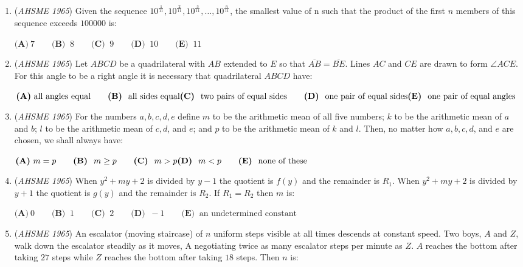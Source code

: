 \begin{enumerate}
 $\textbf{(A)}\ .0301 \qquad  \textbf{(B) }\ .0349 \qquad  \textbf{(C) }\ .0399 \qquad  \textbf{(D) }\ .0401 \qquad  \textbf{(E) }\ .0499\qquad$


	\item (\textit{AHSME 1965}) Given the sequence $10^{\frac {1}{11}},10^{\frac {2}{11}},10^{\frac {3}{11}},\ldots,10^{\frac {n}{11}}$, 
the smallest value of n such that the product of the first $n$ members of this sequence exceeds $100000$ is: 


 $\textbf{(A)}\ 7 \qquad  \textbf{(B) }\ 8 \qquad  \textbf{(C) }\ 9 \qquad  \textbf{(D) }\ 10 \qquad  \textbf{(E) }\ 11$


	\item (\textit{AHSME 1965}) Let $ABCD$ be a quadrilateral with $AB$ extended to $E$ so that $\overline{AB} = \overline{BE}$. 
Lines $AC$ and $CE$ are drawn to form $\angle{ACE}$. For this angle to be a right angle it is necessary that quadrilateral $ABCD$ have: 


 $\textbf{(A)}\ \text{all angles equal} \qquad \textbf{(B) }\ \text{all sides equal} \\ \textbf{(C) }\ \text{two pairs of equal sides} \qquad \textbf{(D) }\ \text{one pair of equal sides} \\ \textbf{(E) }\ \text{one pair of equal angles}$


	\item (\textit{AHSME 1965}) For the numbers $a, b, c, d, e$ define $m$ to be the arithmetic mean of all five numbers; 
$k$ to be the arithmetic mean of $a$ and $b$; $l$ to be the arithmetic mean of $c, d$, and $e$; 
and $p$ to be the arithmetic mean of $k$ and $l$. Then, no matter how $a, b, c, d$, and $e$ are chosen, we shall always have: 


 $\textbf{(A)}\ m = p \qquad  \textbf{(B) }\ m \ge p \qquad  \textbf{(C) }\ m > p \qquad \\ \textbf{(D) }\ m < p\qquad \textbf{(E) }\ \text{none of these}$


	\item (\textit{AHSME 1965}) When $y^2 + my + 2$ is divided by $y - 1$ the quotient is $f(y)$ and the remainder is $R_1$. 
When $y^2 + my + 2$ is divided by $y + 1$ the quotient is $g(y)$ and the remainder is $R_2$. If $R_1 = R_2$ then $m$ is: 


 $\textbf{(A)}\ 0 \qquad  \textbf{(B) }\ 1 \qquad  \textbf{(C) }\ 2 \qquad  \textbf{(D) }\ - 1 \qquad  \textbf{(E) }\ \text{an undetermined constant}$


	\item (\textit{AHSME 1965}) An escalator (moving staircase) of $n$ uniform steps visible at all times descends at constant speed. 
Two boys, $A$ and $Z$, walk down the escalator steadily as it moves, A negotiating twice as many escalator 
steps per minute as $Z$. $A$ reaches the bottom after taking $27$ steps while $Z$ reaches the bottom after taking $18$ steps. Then $n$ is: 



\end{enumerate}

